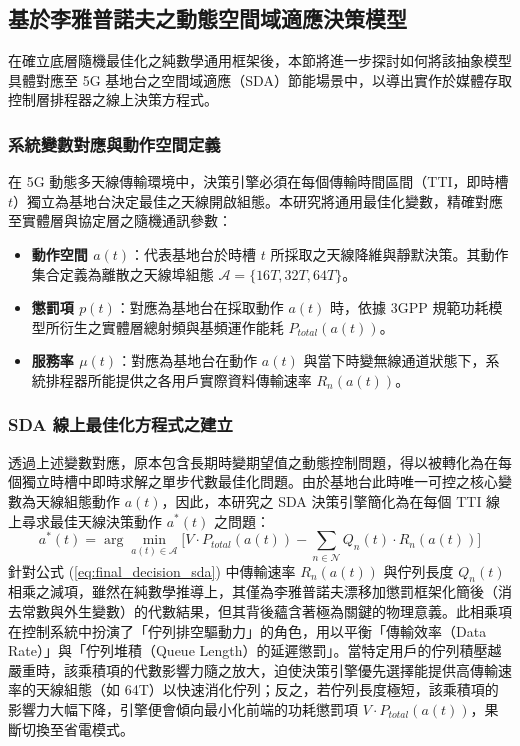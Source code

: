 \subsection{基於李雅普諾夫之動態空間域適應決策模型}
\label{sec:lyapunov_sda_model}

在確立底層隨機最佳化之純數學通用框架後，本節將進一步探討如何將該抽象模型具體對應至 5G 基地台之空間域適應（SDA）節能場景中，以導出實作於媒體存取控制層排程器之線上決策方程式。

\subsubsection{系統變數對應與動作空間定義}
在 5G 動態多天線傳輸環境中，決策引擎必須在每個傳輸時間區間（TTI，即時槽 $t$）獨立為基地台決定最佳之天線開啟組態。本研究將通用最佳化變數，精確對應至實體層與協定層之隨機通訊參數：
\begin{itemize}
    \item \textbf{動作空間 $a(t)$}：代表基地台於時槽 $t$ 所採取之天線降維與靜默決策。其動作集合定義為離散之天線埠組態 $\mathcal{A} = \{16T, 32T, 64T\}$。
    \item \textbf{懲罰項 $p(t)$}：對應為基地台在採取動作 $a(t)$ 時，依據 3GPP 規範功耗模型所衍生之實體層總射頻與基頻運作能耗 $P_{total}(a(t))$。
    \item \textbf{服務率 $\mu(t)$}：對應為基地台在動作 $a(t)$ 與當下時變無線通道狀態下，系統排程器所能提供之各用戶實際資料傳輸速率 $R_n(a(t))$。
\end{itemize}

\subsubsection{SDA 線上最佳化方程式之建立}
透過上述變數對應，原本包含長期時變期望值之動態控制問題，得以被轉化為在每個獨立時槽中即時求解之單步代數最佳化問題。由於基地台此時唯一可控之核心變數為天線組態動作 $a(t)$，因此，本研究之 SDA 決策引擎簡化為在每個 TTI 線上尋求最佳天線決策動作 $a^*(t)$ 之問題：
\begin{equation}
    a^*(t) = \arg\min_{a(t) \in \mathcal{A}} \Big[ V \cdot P_{total}(a(t)) - \sum_{n \in \mathcal{N}} Q_n(t) \cdot R_n(a(t)) \Big]
    \label{eq:final_decision_sda}
\end{equation}
針對公式 (\ref{eq:final_decision_sda}) 中傳輸速率 $R_n(a(t))$ 與佇列長度 $Q_n(t)$ 相乘之減項，雖然在純數學推導上，其僅為李雅普諾夫漂移加懲罰框架化簡後（消去常數與外生變數）的代數結果，但其背後蘊含著極為關鍵的物理意義。此相乘項在控制系統中扮演了「佇列排空驅動力」的角色，用以平衡「傳輸效率（Data Rate）」與「佇列堆積（Queue Length）的延遲懲罰」。當特定用戶的佇列積壓越嚴重時，該乘積項的代數影響力隨之放大，迫使決策引擎優先選擇能提供高傳輸速率的天線組態（如 64T）以快速消化佇列；反之，若佇列長度極短，該乘積項的影響力大幅下降，引擎便會傾向最小化前端的功耗懲罰項 $V \cdot P_{total}(a(t))$，果斷切換至省電模式。

